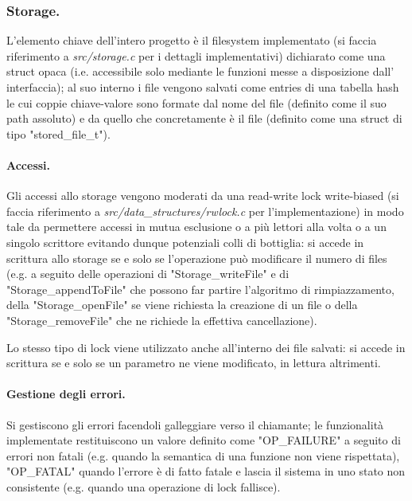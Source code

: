 \documentclass[11pt, italian, openany]{book}
\begin{document}
\begin{sloppypar}
\subsubsection{Storage.}
L'elemento chiave dell'intero progetto \`e il filesystem implementato (si faccia riferimento a \textit{src/storage.c} per i
dettagli implementativi) dichiarato come una struct opaca (i.e. accessibile solo mediante le funzioni messe a di\-spo\-sizione dall'
interfaccia); al suo interno i file vengono salvati come entries di una tabella hash le cui coppie chiave-valore sono formate
dal nome del file (definito come il suo path assoluto) e da quello che concretamente \`e il file (definito come una struct
di tipo "stored\_file\_t").

\paragraph*{Accessi.}
Gli accessi allo storage vengono moderati da una read-write lock write-biased (si faccia riferimento a
\textit{src/data\_structures/rwlock.c} per l'implementazione) in modo tale da permettere accessi in mutua esclusione o a pi\`u
lettori alla volta o a un singolo scrittore evitando dunque potenziali colli di bottiglia: si accede in scrittura allo sto\-ra\-ge se
e solo se l'operazione pu\`o modificare il numero di files (e.g. a seguito delle operazioni di "Storage\_writeFile" e di
"Storage\_appendToFile" che possono far partire l'algoritmo di rimpiazzamento, della "Storage\_openFile" se viene richiesta
la creazione di un file o della "Storage\_removeFile" che ne richiede la effettiva cancellazione).

Lo stesso tipo di lock viene utilizzato anche all'interno dei file salvati: si accede in scrittura se e solo se un parametro
ne viene modificato, in lettura altrimenti.

\paragraph*{Gestione degli errori.}
Si gestiscono gli errori facendoli galleggiare verso il chiamante; le funzionalit\`a implementate restituiscono un valore definito
come "OP\_FAILURE" a seguito di errori non fatali (e.g. quando la semantica di una funzione non viene rispettata), "OP\_FATAL"
quando l'errore \`e di fatto fatale e lascia il sistema in uno stato non consistente (e.g. quando una operazione di lock fallisce).


\end{sloppypar}
\end{document}
